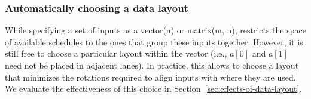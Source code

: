 \subsubsection*{Automatically choosing a data layout}
While specifying a set of inputs as a {\sf vector(n)} or {\sf matrix(m, n)}, \system restricts the space of available schedules to the ones that group these inputs together.
However, it is still free to choose a particular layout within the vector (i.e., $a[0]$ and $a[1]$ need not be placed in adjacent lanes).
In practice, this allows \system to choose a layout that minimizes the rotations required to align inputs with where they are used.
We evaluate the effectiveness of this choice in Section~\ref{sec:effects-of-data-layout}.



